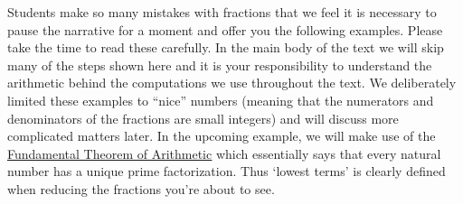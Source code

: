 \documentclass{ximera}
\begin{document}

\smallskip

Students make so many mistakes with fractions that we feel it is necessary to pause the narrative for a moment and offer you the following examples.  Please take the time to read these carefully.  In the main body of the text we will skip many of the steps shown here and it is your responsibility to understand the arithmetic behind the computations we use throughout the text.  We deliberately limited these examples to ``nice'' numbers (meaning that the numerators and denominators of the fractions are small integers) and will discuss more complicated matters later.  In the upcoming example, we will make use of the \href{https://en.wikipedia.org/wiki/Fundamental_theorem_of_arithmetic}{\underline{Fundamental Theorem of Arithmetic}} which essentially says that every natural number has a unique prime factorization.  Thus `lowest terms' is clearly defined when reducing the  fractions you're about to see.

\pagebreak
\end{document}

